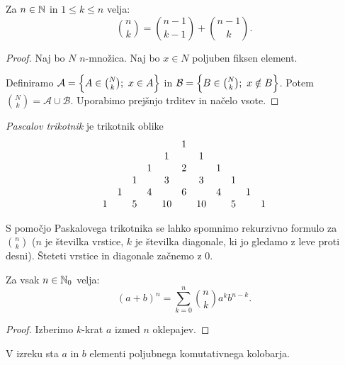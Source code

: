 \begin{trditev}
    Za $n \in \mathbb{N}$ in $1 \leq k \leq n$ velja:
    $$\binom{n}{k} = \binom{n-1}{k-1} + \binom{n-1}{k}.$$
\end{trditev}

\begin{proof}
    Naj bo $N$ $n$-množica. Naj bo $x \in N$ poljuben fiksen element. 
    
    Definiramo $\mathcal{A} = \left\{A \in \binom{N}{k}; \ x \in A\right\}$ in $\mathcal{B} = \left\{B \in \binom{N}{k}; \ x \notin B\right\}$. Potem $\binom{N}{k} = \mathcal{A} \cup \mathcal{B}$. Uporabimo prejšnjo trditev in načelo vsote.
\end{proof}

\begin{definicija} 
    \emph{Pascalov trikotnik} je trikotnik oblike
    \[
    \setcounter{MaxMatrixCols}{20}   
    \begin{matrix}
        &&&&& 1 \\
        &&&& 1 && 1 \\
        &&& 1 && 2 && 1 \\
        && 1 && 3 && 3 && 1 \\
        & 1 && 4 && 6 && 4 && 1 \\
        1 && 5 && 10 && 10 && 5 && 1 

    \end{matrix}
    \]
\end{definicija}

\begin{opomba}
    S pomočjo Paskalovega trikotnika se lahko spomnimo rekurzivno formulo za $\binom{n}{k}$ ($n$ je številka vrstice, $k$ je številka diagonale, ki jo gledamo z leve proti desni). Šteteti vrstice in diagonale začnemo z $0$.
\end{opomba}

\begin{izrek}
    Za vsak $n \in \mathbb{N}_0$ velja:
    $$(a+b)^n = \sum_{k=0}^{n} \binom{n}{k}a^kb^{n-k}.$$
\end{izrek}

\begin{proof}
    Izberimo $k$-krat $a$ izmed $n$ oklepajev.
\end{proof}

\begin{opomba}
    V izreku sta $a$ in $b$ elementi poljubnega komutativnega kolobarja.
\end{opomba}

\newpage
